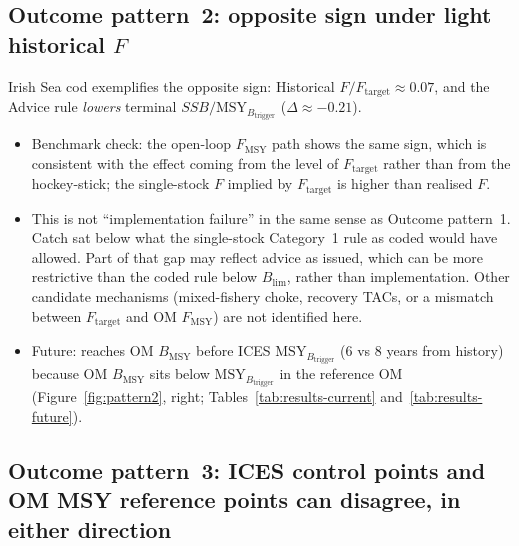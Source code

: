 \documentclass[11pt,a4paper]{article}
\newcommand{\Fmsy}{F_{\mathrm{MSY}}}
\newcommand{\Blim}{B_{\lim}}
\newcommand{\Btrig}{\mathrm{MSY}_{B_{\mathrm{trigger}}}}
\newcommand{\Bmsy}{B_{\mathrm{MSY}}}
\newcommand{\Ftar}{F_{\mathrm{target}}}
\begin{document}
\subsection{Outcome pattern~2: opposite sign under light historical \texorpdfstring{$F$}{F}}
\label{sec:res-opposite}

Irish Sea cod exemplifies the opposite sign: Historical
$F/\Ftar \approx 0.07$, and the Advice rule \emph{lowers} terminal
$SSB/\Btrig$ ($\Delta \approx -0.21$).
\begin{itemize}
  \item Benchmark check: the open-loop $\Fmsy$ path shows the same
        sign, which is consistent with the effect coming from the level
        of $\Ftar$ rather than from the hockey-stick; the single-stock
        $F$ implied by $\Ftar$ is higher than realised $F$.
  \item This is not ``implementation failure'' in the same sense as
        Outcome pattern~1. Catch sat below what the single-stock
        Category~1 rule as coded would have allowed. Part of that gap
        may reflect advice as issued, which can be more restrictive than
        the coded rule below $\Blim$, rather than implementation. Other
        candidate mechanisms (mixed-fishery choke, recovery TACs, or a
        mismatch between $\Ftar$ and OM $\Fmsy$) are not identified here.
  \item Future: reaches OM $\Bmsy$ before ICES $\Btrig$ (6 vs 8 years
        from history) because OM $\Bmsy$ sits below $\Btrig$ in the
        reference OM (Figure~\ref{fig:pattern2}, right;
        Tables~\ref{tab:results-current} and~\ref{tab:results-future}).
\end{itemize}

\subsection{Outcome pattern~3: ICES control points and OM MSY reference points can disagree, in either direction}
\label{sec:res-scoring}
\end{document}
